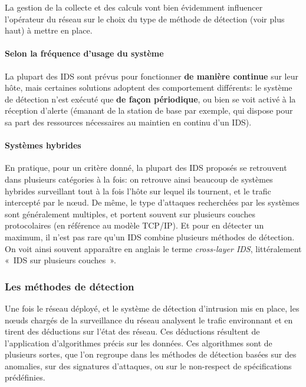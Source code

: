 La gestion de la collecte et des calculs vont bien évidemment influencer l'opérateur du réseau sur le choix du type de méthode de détection (voir plus haut) à mettre en place.

        \paragraph{Selon la fréquence d'usage du système}
La plupart des IDS sont prévus pour fonctionner \textbf{de manière continue} sur leur hôte, mais certaines solutions adoptent des comportement différents: le système de détection n'est exécuté que \textbf{de façon périodique}, ou bien se voit activé à la réception d'alerte (émanant de la station de base par exemple, qui dispose pour sa part des ressources nécessaires au maintien en continu d'un IDS).

        \paragraph{Systèmes hybrides}
En pratique, pour un critère donné, la plupart des IDS proposés se retrouvent dans plusieurs catégories à la fois: on retrouve ainsi beaucoup de systèmes hybrides surveillant tout à la fois l'hôte sur lequel ils tournent, et le trafic intercepté par le nœud.
De même, le type d'attaques recherchées par les systèmes sont généralement multiples, et portent souvent sur plusieurs couches protocolaires (en référence au modèle TCP/IP).
Et pour en détecter un maximum, il n'est pas rare qu'un IDS combine plusieurs méthodes de détection.
On voit ainsi souvent apparaître en anglais le terme \textit{cross-layer IDS}, littéralement « IDS sur plusieurs couches ».

    \subsubsection{Les méthodes de détection}\label{ea:sss:detect}
Une fois le réseau déployé, et le système de détection d'intrusion mis en place, les nœuds chargés de la surveillance du réseau analysent le trafic environnant et en tirent des déductions sur l'état des réseau.
Ces déductions résultent de l'application d'algorithmes précis sur les données.
Ces algorithmes sont de plusieurs sortes, que l'on regroupe dans les méthodes de détection basées sur des anomalies, sur des signatures d'attaques, ou sur le non-respect de spécifications prédéfinies.

